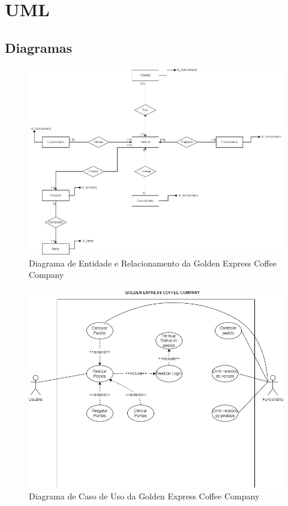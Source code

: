 
\chapter{UML}
\section{Diagramas}

\begin{figure}[!h]
	\centering
	\includegraphics[width=15cm]{DER}
	\caption{Diagrama de Entidade e
		Relacionamento da Golden Express Coffee Company}
\end{figure}

\begin{figure}[!h]
	\centering
	\includegraphics[width=15cm]{DCU}
	\caption{Diagrama de Caso de Uso da Golden Express Coffee Company}
\end{figure}

